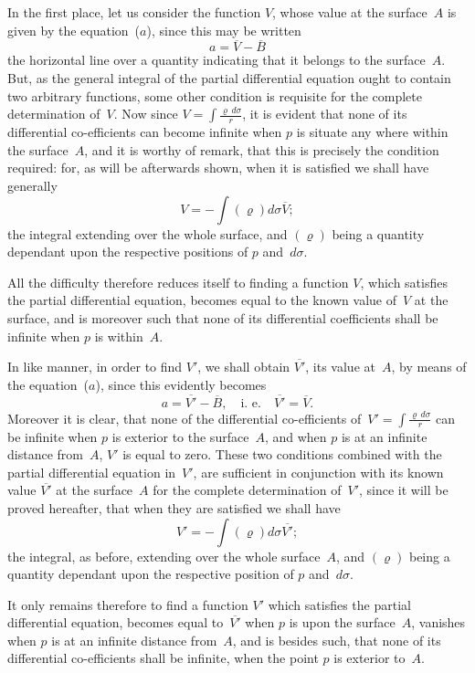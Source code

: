 \documentclass[11pt,notitlepage]{amsart}
\renewcommand{\rho}{\varrho}
\begin{document}
In the first place, let us consider the function $V$, whose value at the
surface~$A$ is given by the equation~($a$), since this may be written
\[
a=\overline{V}-\overline{B}
\]
the horizontal line over a quantity indicating
that it belongs to the surface~$A$.
But, as the general integral of the partial
differential equation ought to contain
two arbitrary functions, some other condition is requisite for the complete
determination of~$V$. Now since $V=\int\frac{\rho\,d\sigma}{r}$,
it is evident that none of its
differential co-efficients can become infinite
when $p$ is situate any where within
the surface~$A$, and it is worthy of remark,
that this is precisely the condition
required: for, as will be afterwards shown,
when it is satisfied we shall have generally
\[
V=-\int(\rho)d\sigma \overline{V};
\]
the integral extending over the whole surface,
and $(\rho)$ being a quantity dependant
upon the respective positions of $p$ and~$d\sigma$.

All the difficulty therefore reduces itself to finding a function $V$, which
satisfies the partial differential equation, becomes equal to the known value
of~$V$ at the surface,
and is moreover such that none of its differential coefficients
shall be infinite when $p$ is within~$A$.

In like manner, in order to find $V'$, we shall obtain
$\overline{V'}$, its value at~$A$,
by means of the equation~($a$), since this evidently becomes
\[
a=\overline{V'}-\overline{B},\quad\text{i.~e.}\quad
\overline{V'}=\overline{V}.
\]
Moreover it is clear, that none of the differential co-efficients
of~${V'=\int\frac{\rho\,d\sigma}{r}}$
can be infinite when $p$ is exterior to the surface~$A$,
and when $p$ is at an
infinite distance from~$A$,
$V'$ is equal to zero. These two conditions combined
with the partial differential equation in~$V'$, are sufficient in conjunction
with its known value $\overline{V'}$
at the surface~$A$ for the complete determination of~$V'$,
since it will be proved hereafter, that when they are satisfied we shall have
\[
V'=-\int(\rho)d\sigma \overline{V'};
\]
the integral, as before, extending over the whole surface~$A$,
and $(\rho)$ being a
quantity dependant upon the respective position of $p$ and~$d\sigma$.

It only remains therefore to find a function $V'$ which satisfies the partial
differential equation, becomes equal to~$\overline{V'}$
when $p$ is upon the surface~$A$, vanishes
when $p$ is at an infinite distance from~$A$, and is besides such, that none of
its differential co-efficients shall be infinite,
when the point $p$ is exterior to~$A$.
\end{document}
